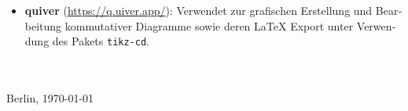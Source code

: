 {\begin{otherlanguage}{ngerman}
\begin{enumerate}[noitemsep]
\begin{itemize}
	Verwendet zur Erklärung und Klärung mathematischer Konzepte zu algebraischen Stacks
	und dem Keel--Mori-Theorem, zur Unterstützung bei der Literaturrecherche sowie zur
	sprachlichen Überprüfung von Textpassagen. Alle mathematischen Inhalte, Argumente
	und Schlussfolgerungen wurden eigenständig geprüft und liegen in der alleinigen
	Verantwortung des Autors.
	\item \textbf{quiver} (\url{https://q.uiver.app/}):
	Verwendet zur grafischen Erstellung und Bearbeitung kommutativer
	Diagramme sowie deren LaTeX Export unter Verwendung des
	Pakets \texttt{tikz-cd}.
\end{itemize}
\end{enumerate}
\vspace*{4ex}
\makebox[3in][l]{\hrulefill}\\
\textsc{\autor} \\
Berlin, \today 
\end{otherlanguage}
\pagebreak
\begin{otherlanguage}{english}

\end{otherlanguage}}
